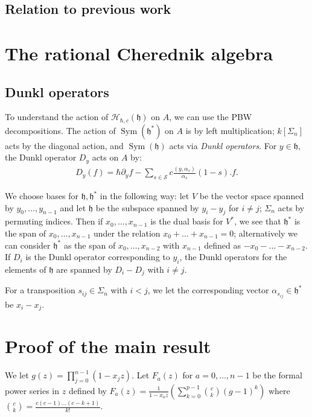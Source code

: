 \documentclass{article}
\numberwithin{equation}{section}
\newcommand{\h}{\mathfrak{h}}
\newcommand{\HH}{\mathcal{H}}
\newcommand{\Sym}{\operatorname{Sym}}
\begin{document}
\subsection{Relation to previous work}




 \section{The rational Cherednik algebra}
 
 \subsection{Dunkl operators}

To understand the action of $\HH_{\hbar,c}(\h)$ on $A$, we can use the PBW decompositions. The action of $\Sym(\h^*)$ on $A$ is by left multiplication; $k[\Sigma_n]$ acts by the diagonal action, and $\Sym(\h)$ acts via {\it Dunkl operators}. For $y \in \h$, the Dunkl operator $D_y$ acts on $A$ by:
\begin{align*}
D_y(f) = \hbar \partial_y f  - \sum_{s \in \mathcal{S}} c \frac{ ( y, \alpha_s )}{\alpha_s} (1-s). f.
\end{align*}

We choose bases for $\h,\h^*$ in the following way: let $V$ be the vector space spanned by $y_0,\dots,y_{n-1}$ and let $\h$ be the subspace spanned by $y_i-y_j$ for $i \ne j$; $\Sigma_n$ acts by permuting indices. Then if $x_0,\dots,x_{n-1}$ is the dual basis for $V^*$, we see that $\h^*$ is the span of $x_0,\dots,x_{n-1}$ under the relation $x_0+\dots+x_{n-1}=0$; alternatively we can consider $\h^*$ as the span of $x_0,\dots,x_{n-2}$ with $x_{n-1}$ defined as $-x_0-\dots-x_{n-2}$.  If $D_i$ is the Dunkl operator corresponding to $y_i$, the Dunkl operators for the elements of $\h$ are spanned by $D_i-D_j$ with $i \ne j$. 

For a transposition $s_{ij} \in \Sigma_n$ with $i<j$, we let the corresponding vector $\alpha_{s_{ij}} \in \h^*$ be $x_i-x_j$.



\section{Proof of the main result}



We let $g(z)=\prod_{j=0}^{n-1} (1-x_jz)$. Let $F_a(z)$ for $a=0,\dots,n-1$ be the formal power series in $z$ defined by $F_a(z)=\frac{1}{1-x_az} \left( \sum_{k=0}^{p-1} \binom{c}{k}(g-1)^k\right)$ where $\binom{c}{k}=\frac{c(c-1)\dots(c-k+1)}{k!}$. 
\end{document}
